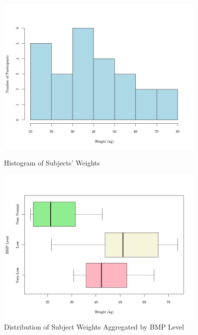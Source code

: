 \documentclass{article}
\begin{document}
		\begin{figure}[h!]
			\centering
			\tiny
			\begin{minipage}{0.46\textwidth}
			  \centering
			  \tiny
			  \includegraphics[width=0.9\textwidth]{graph2/HistWeight.png}
			  \caption{Histogram of Subjects' Weights}
			  \label{fig:histogram}
			\end{minipage}\hfill
			\begin{minipage}{0.46\textwidth}
			  \centering
			  \tiny
			  \includegraphics[width=0.9\textwidth]{graph2/BoxWeight.png}
			  \caption{Distribution of Subject Weights Aggregated by BMP Level}
			  \label{fig:boxplots}
			\end{minipage}
		\end{figure}
		
\end{document}
